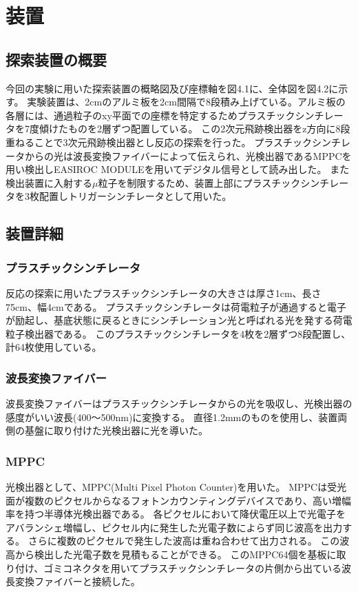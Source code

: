 \chapter{装置} \label{equipment}
\section{探索装置の概要}
今回の実験に用いた探索装置の概略図及び座標軸を図4.1に、全体図を図4.2に示す。
実験装置は、2cmのアルミ板を2cm間隔で8段積み上げている。アルミ板の各層には、通過粒子のxy平面での座標を特定するためプラスチックシンチレータを7度傾けたものを2層ずつ配置している。
この2次元飛跡検出器をz方向に8段重ねることで3次元飛跡検出器とし反応の探索を行った。
プラスチックシンチレータからの光は波長変換ファイバーによって伝えられ、光検出器であるMPPCを用い検出しEASIROC MODULEを用いてデジタル信号として読み出した。
また検出装置に入射する$\mu$粒子を制限するため、装置上部にプラスチックシンチレータを3枚配置しトリガーシンチレータとして用いた。

\section{装置詳細}
\subsection{プラスチックシンチレータ}
反応の探索に用いたプラスチックシンチレータの大きさは厚さ1cm、長さ75cm、幅4cmである。
プラスチックシンチレータは荷電粒子が通過すると電子が励起し、基底状態に戻るときにシンチレーション光と呼ばれる光を発する荷電粒子検出器である。
このプラスチックシンチレータを4枚を2層ずつ8段配置し、計64枚使用している。

\subsection{波長変換ファイバー}
波長変換ファイバーはプラスチックシンチレータからの光を吸収し、光検出器の感度がいい波長(400～500nm)に変換する。
直径1.2mmのものを使用し、装置両側の基盤に取り付けた光検出器に光を導いた。

\subsection{MPPC}
光検出器として、MPPC(Multi Pixel Photon Counter)を用いた。
MPPCは受光面が複数のピクセルからなるフォトンカウンティングデバイスであり、高い増幅率を持つ半導体光検出器である。
各ピクセルにおいて降伏電圧以上で光電子をアバランシェ増幅し、ピクセル内に発生した光電子数によらず同じ波高を出力する。
さらに複数のピクセルで発生した波高は重ね合わせて出力される。
この波高から検出した光電子数を見積もることができる。
このMPPC64個を基板に取り付け、ゴミコネクタを用いてプラスチックシンチレータの片側から出ている波長変換ファイバーと接続した。

